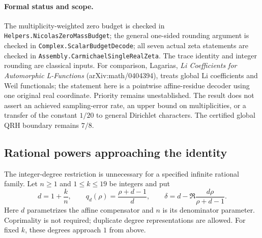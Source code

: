 \paragraph{Formal status and scope.}
The multiplicity-weighted zero budget is checked in
\texttt{Helpers.NicolasZeroMassBudget}; the general one-sided rounding
argument is checked in \texttt{Complex.ScalarBudgetDecode}; all seven
actual zeta statements are checked in
\texttt{Assembly.CarmichaelSingleRealZeta}. The trace identity and integer
rounding are classical inputs. For comparison, Lagarias,
\textit{Li Coefficients for Automorphic L-Functions}
(arXiv:math/0404394), treats global Li coefficients and Weil functionals;
the statement here is a pointwise affine-residue decoder using one original
real coordinate. Priority remains unestablished. The result does not assert
an achieved sampling-error rate, an upper bound on multiplicities, or a
transfer of the constant \(1/20\) to general Dirichlet characters.
The certified global QRH boundary remains \(7/8\).

\subsection{Rational powers approaching the identity}
\label{sec:rational-single-real-zeta}

The integer-degree restriction is unnecessary for a specified infinite
rational family. Let \(n\ge1\) and \(1\le k\le19\) be integers and put
\[
 d=1+\frac{k}{n},\qquad q_d(\rho)=\frac{\rho+d-1}{d},\qquad
 \delta=d-\Re\frac{d\rho}{\rho+d-1}.
\]
Here \(d\) parametrizes the affine compensator and \(n\) is its denominator
parameter. Coprimality is not required; duplicate degree representations
are allowed. For fixed \(k\), these degrees approach \(1\) from above.

